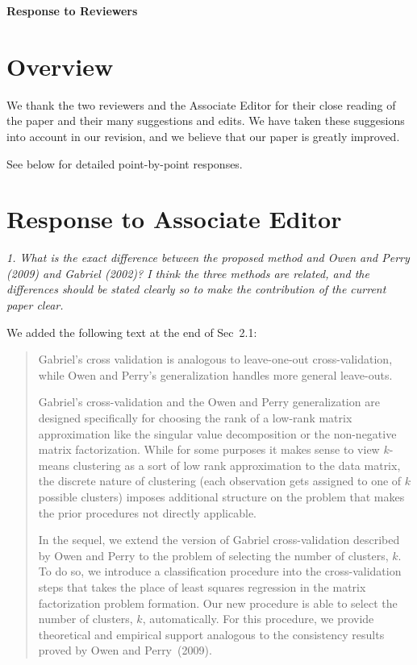 \documentclass[11pt]{article}
\begin{document}
\begin{center}\textbf{\LARGE Response to Reviewers}
\end{center}

\section{Overview}

We thank the two reviewers and the Associate Editor for their close reading of
the paper and their many suggestions and edits. We have taken these suggesions
into account in our revision, and we believe that our paper is greatly
improved.

See below for detailed point-by-point responses.


\section{Response to Associate Editor}

\emph{1. What is the exact difference between the proposed method and Owen and
Perry (2009) and Gabriel (2002)? I think the three methods are related, and
the differences should be stated clearly so to make the contribution of the
current paper clear.}

We added the following text at the end of Sec~2.1:

\begin{quote}
Gabriel's cross validation is analogous to leave-one-out cross-validation,
while Owen and Perry's generalization handles more general leave-outs.

Gabriel's cross-validation and the Owen and Perry generalization are designed
specifically for choosing the rank of a low-rank matrix approximation like the
singular value decomposition or the non-negative matrix factorization. While
for some purposes it makes sense to view $k$-means clustering as a sort of low
rank approximation to the data matrix, the discrete nature of clustering (each
observation gets assigned to one of $k$ possible clusters) imposes additional
structure on the problem that makes the prior procedures not directly
applicable.

In the sequel, we extend the version of Gabriel cross-validation described by
Owen and Perry to the problem of selecting the number of clusters, $k$. To do
so, we introduce a classification procedure into the cross-validation steps
that takes the place of least squares regression in the matrix factorization
problem formation. Our new procedure is able to select the number of clusters,
$k$, automatically. For this procedure, we provide theoretical and empirical
support analogous to the consistency results proved by Owen and Perry~(2009).
\end{quote}
\end{document}
